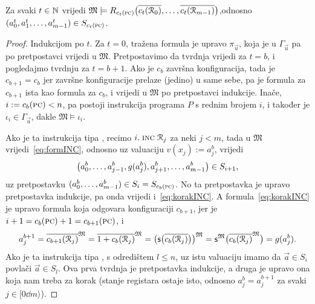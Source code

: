 \begin{lema}[{name=[izračunavanje čuva istinitost formula pojedinih konfiguracija]}]\label{lm:formcomputesteps}
Za svaki $t\in{\mathbb N}$ vrijedi $\mathfrak M\models R_{c_t(\textsc{pc})}\bigl(\overline{c_t(\mathcal R_{0})},\dotsc,\overline{c_t(\mathcal R_{m-1})}\bigr)$,\newline odnosno $(a_0^t,a_1^t,\dotsc,a_{m-1}^t)\in S_{c_t(\textsc{pc})}$.
\end{lema}
\begin{proof}
Indukcijom po $t$. Za $t=0$, tražena formula je upravo $\pi_{\vec u}$, koja je u $\Gamma_{\vec u}$ pa po pretpostavci vrijedi u $\mathfrak M$. Pretpostavimo da tvrdnja vrijedi za $t=b$, i pogledajmo tvrdnju za $t=b+1$. Ako je $c_b$ završna konfiguracija, tada je $c_{b+1}=c_b$ jer završne konfiguracije prelaze (jedino) u same sebe, pa je formula za $c_{b+1}$ ista kao formula za $c_b$, i vrijedi u $\mathfrak M$ po pretpostavci indukcije. Inače, $i:=c_b(\textsc{pc})<n$, pa postoji instrukcija programa $P$ s rednim brojem $i$, i također je $\iota_i\in\Gamma_{\vec u}$, dakle $\mathfrak M\models\iota_i$.

Ako je ta instrukcija tipa \inc, recimo $i.\;\textsc{inc}\;\mathcal R_{j}$ za neki $j<m$, tada u $\mathfrak M$ vrijedi~\eqref{eq:formINC}, odnosno uz valuaciju $v(x_j):=a_j^b$, vrijedi
\begin{equation}
\label{eq:korakINC}
	\bigl(a_0^b,\dotsc,a_{j-1}^b,g(a_j^b),a_{j+1}^b,\dotsc,a_{m-1}^b\bigr)\in S_{i+1}\text,
\end{equation} uz pretpostavku $(a_0^b,\dotsc,a_{m-1}^b)\in S_i=S_{c_b(\textsc{pc})}$. No ta pretpostavka je upravo pretpostavka indukcije, pa onda vrijedi i~\eqref{eq:korakINC}. A formula~\eqref{eq:korakINC} je upravo formula koja odgovara konfiguraciji $c_{b+1}$, jer je $i+1=c_b(\textsc{pc})+1=c_{b+1}(\textsc{pc})$, i
\begin{equation}
	a_j^{b+1}=\overline{c_{b+1}(\mathcal R_{j})}^{\mathfrak M}=\overline{1+c_b(\mathcal R_{j})}^{\mathfrak M}=\bigl(\mathsf s\bigl(\overline{c_b(\mathcal R_{j})}\bigr)\bigr)^{\mathfrak M}
	=\mathsf s^{\mathfrak M}\bigl(\overline{c_b(\mathcal R_{j})}^{\mathfrak M}\bigr)=g(a_j^b)\text.
\end{equation}
	Ako je ta instrukcija tipa \goto, s odredištem $l\le n$, uz istu valuaciju imamo da $\vec a\in S_i$ povlači $\vec a\in S_l$. Ova prva tvrdnja je pretpostavka indukcije, a druga je upravo ona koja nam treba za korak (stanje registara ostaje isto, odnosno $a_j^b=a_j^{b+1}$ za svaki $j\in[0\dd m\rangle$).


\end{proof}
